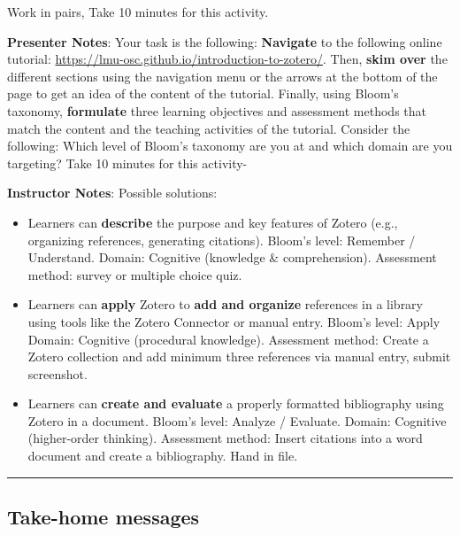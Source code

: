 \documentclass[
  letterpaper,
  DIV=11,
  numbers=noendperiod]{scrartcl}
\begin{document}
Work in pairs, Take 10 minutes for this activity.

\textbf{Presenter Notes}: Your task is the following: \textbf{Navigate}
to the following online tutorial:
\url{https://lmu-osc.github.io/introduction-to-zotero/}. Then,
\textbf{skim over} the different sections using the navigation menu or
the arrows at the bottom of the page to get an idea of the content of
the tutorial. Finally, using Bloom's taxonomy, \textbf{formulate} three
learning objectives and assessment methods that match the content and
the teaching activities of the tutorial. Consider the following: Which
level of Bloom's taxonomy are you at and which domain are you targeting?
Take 10 minutes for this activity-

\textbf{Instructor Notes}: Possible solutions:

\begin{itemize}
\item
  Learners can \textbf{describe} the purpose and key features of Zotero
  (e.g., organizing references, generating citations). Bloom's level:
  Remember / Understand. Domain: Cognitive (knowledge \& comprehension).
  Assessment method: survey or multiple choice quiz.
\item
  Learners can \textbf{apply} Zotero to \textbf{add and organize}
  references in a library using tools like the Zotero Connector or
  manual entry. Bloom's level: Apply Domain: Cognitive (procedural
  knowledge). Assessment method: Create a Zotero collection and add
  minimum three references via manual entry, submit screenshot.
\item
  Learners can \textbf{create and evaluate} a properly formatted
  bibliography using Zotero in a document. Bloom's level: Analyze /
  Evaluate. Domain: Cognitive (higher-order thinking). Assessment
  method: Insert citations into a word document and create a
  bibliography. Hand in file.
\end{itemize}

\begin{center}\rule{0.5\linewidth}{0.5pt}\end{center}

\subsection{Take-home messages}\label{take-home-messages}
\end{document}
